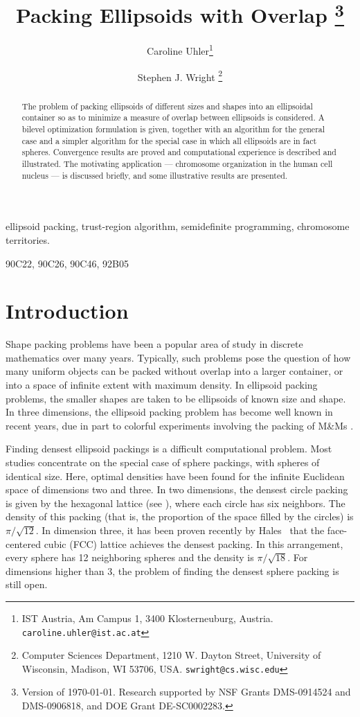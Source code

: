 \documentclass{siamltex}
\title{Packing Ellipsoids with Overlap  \thanks{Version of \today. Research supported by NSF Grants
    DMS-0914524 and DMS-0906818, and DOE Grant DE-SC0002283.}}
\author{Caroline Uhler\thanks{IST Austria, Am Campus 1, 3400 Klosterneuburg, Austria. \texttt{caroline.uhler@ist.ac.at}}
\and 
Stephen J. Wright \thanks{Computer Sciences Department, 1210
W. Dayton Street, University of Wisconsin, Madison, WI 53706, USA. \texttt{swright@cs.wisc.edu}}}
\begin{document}
\maketitle

\begin{abstract}
  The problem of packing ellipsoids of different sizes and shapes into
  an ellipsoidal container so as to minimize a measure of overlap
  between ellipsoids is considered. A bilevel optimization formulation
  is given, together with an algorithm for the general case and a
  simpler algorithm for the special case in which all ellipsoids are
  in fact spheres. Convergence results are proved and computational
  experience is described and illustrated. The motivating application
  --- chromosome organization in the human cell nucleus --- is
  discussed briefly, and some illustrative results are presented.
\end{abstract}

\begin{keywords}
  ellipsoid packing, trust-region algorithm, semidefinite programming,
  chromosome territories.
\end{keywords}

\begin{AMS}
90C22, 90C26, 90C46, 92B05
\end{AMS}

\section{Introduction} \label{sec:intro}

Shape packing problems have been a popular area of study in discrete
mathematics over many years. Typically, such problems pose the
question of how many uniform objects can be packed without overlap
into a larger container, or into a space of infinite extent with
maximum density. In ellipsoid packing problems, the smaller shapes are
taken to be ellipsoids of known size and shape. In three dimensions,
the ellipsoid packing problem has become well known in recent years,
due in part to colorful experiments involving the packing of M\&Ms
\cite{Donev}.

Finding densest ellipsoid packings is a difficult computational
problem. Most studies concentrate on the special case of sphere
packings, with spheres of identical size. Here, optimal densities have
been found for the infinite Euclidean space of dimensions two and
three. In two dimensions, the densest circle packing is given by the
hexagonal lattice (see \cite{Thue}), where each circle has six
neighbors. The density of this packing (that is, the proportion of the
space filled by the circles) is $\pi/\sqrt{12}$. In dimension three,
it has been proven recently by Hales~\cite{Hales} that the
face-centered cubic (FCC) lattice achieves the densest packing. In
this arrangement, every sphere has 12 neighboring spheres and the
density is $\pi/\sqrt{18}$. For dimensions higher than 3, the problem
of finding the densest sphere packing is still open.
\end{document}
